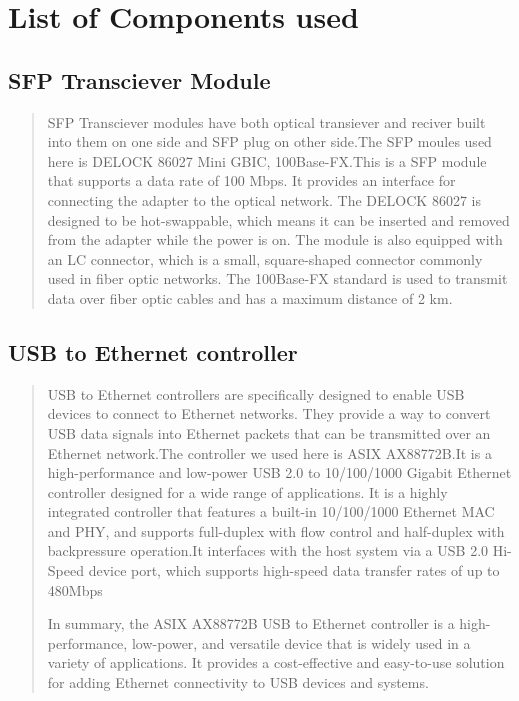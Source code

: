 \documentclass[fontsize=12pt,
parskip=half,	%
department=FakM,  %
twoside, %
DIV=15,BCOR=10mm, %
svgnames,table,hyperref, %
bookmarks, raiselinks, pageanchor, hyperindex, colorlinks, hidelinks, %
]{OTHRreprt}
\begin{document}
	\section{List of Components used}
	
	\subsection{SFP Transciever Module}
	\begin{quote}
	SFP Transciever modules have both optical transiever and reciver built into them on one side and SFP plug on other side.The SFP moules used here is DELOCK 86027 Mini GBIC, 100Base-FX.This is a SFP module that supports a data rate of 100 Mbps. It provides an interface for connecting the adapter to the optical network. The DELOCK 86027 is designed to be hot-swappable, which means it can be inserted and removed from the adapter while the power is on. The module is also equipped with an LC connector, which is a small, square-shaped connector commonly used in fiber optic networks. The 100Base-FX standard is used to transmit data over fiber optic cables and has a maximum distance of 2 km.
	\end{quote}
	
	\subsection{USB to Ethernet controller}
	\begin{quote}
	USB to Ethernet controllers are specifically designed to enable USB devices to connect to Ethernet networks. They provide a way to convert USB data signals into Ethernet packets that can be transmitted over an Ethernet network.The controller we used here is ASIX AX88772B.It is a high-performance and low-power USB 2.0 to 10/100/1000 Gigabit Ethernet controller designed for a wide range of applications. It is a highly integrated controller that features a built-in 10/100/1000 Ethernet MAC and PHY, and supports full-duplex with flow control and half-duplex with backpressure operation.It interfaces with the host system via a USB 2.0 Hi-Speed device port, which supports high-speed data transfer rates of up to 480Mbps

In summary, the ASIX AX88772B USB to Ethernet controller is a high-performance, low-power, and versatile device that is widely used in a variety of applications. It provides a cost-effective and easy-to-use solution for adding Ethernet connectivity to USB devices and systems.
	\end{quote}
\end{document}
